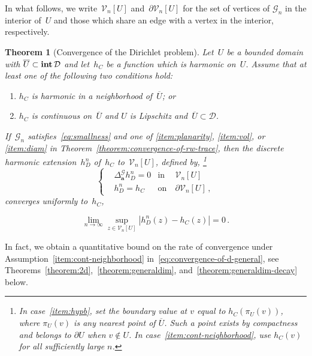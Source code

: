 \documentclass[12pt]{amsart}
\numberwithin{equation}{section}
\DeclareMathOperator{\intr}{\mathop{\bf int}}
\newtheorem{theoremA}{Theorem}[section]
\newcommand{\G}{\mathcal{G}}
\newcommand{\V}{\mathcal{V}}
\newcommand{\aDelta}{\hyperref[eq:geometric-laplacian]{{\Delta^{\mathcal{G}}_{\cond}}}}
\newcommand{\cond}{\hyperref[eq:geometric-laplacian]{\mathbf{a}}}
\begin{document}
In what follows, we write~$\V_n[U]$ and~$\partial \V_n[U]$ for the set of vertices of $\G_n$ in the interior of~$U$ and those which share an edge with a vertex in the interior, respectively. 
\begin{theoremA}[Convergence of the Dirichlet problem] \label{theorem:convergence-of-the-dirichlet-problem}
	Let~$U$ be a bounded domain with $\overline U\subset\intr\mathcal D$ and let~$h_C$ be a function which is harmonic on~$U$. Assume that at least one of the following 
	two conditions hold:  
	\begin{enumerate}[label = (\alph*)]
		\item $h_C$ is harmonic in a neighborhood of~$\overline{U}$; or \label{item:cont-neighborhood}
		\item $h_C$ is continuous on~$\overline{U}$ and $U$ is Lipschitz and~$\overline{U} \subset \mathcal{D}$. \label{item:hypb}
	\end{enumerate}
	 If~$\G_n$ satisfies~\eqref{eq:smallness} and one of \ref{item:planarity}, \ref{item:vol}, or \ref{item:diam} in Theorem~\ref{theorem:convergence-of-rw-trace}, 
	then the discrete harmonic extension~$h^{n}_D$ of~$h_C$ to~$\V_n[U]$, defined by, 
\footnote{In case~\ref{item:hypb}, set the boundary value at $v$ equal to $h_C(\pi_U(v))$, where $\pi_U(v)$ is any nearest point of $\overline U$. Such a point exists by compactness and belongs to $\partial U$ when $v\notin U$. In case~\ref{item:cont-neighborhood}, use $h_C(v)$ for all sufficiently large $n$.}
	\[	
	\left\{	
	\begin{aligned}
		&  \aDelta h^{n}_D = 0 & \mbox{in} & \ \V_n[U] \\
		& h^{n}_D = h_C  & \mbox{on} &  \ \partial \V_n[U]    \, ,
	\end{aligned}
	\right.
	\]
	converges uniformly to~$h_C$,

	\begin{equation}
		\label{eq:convergence-of-d-general}
	\lim_{n \to \infty} \sup_{z \in \V_n[U]} |h^{n}_D(z) - h_C(z)| = 0  \, .
	\end{equation}
\end{theoremA}	
\noindent In fact, we obtain a quantitative bound on the rate of convergence under Assumption~\ref{item:cont-neighborhood} in~\eqref{eq:convergence-of-d-general}, see Theorems~\ref{theorem:2d},~\ref{theorem:generaldim}, and~\ref{theorem:generaldim-decay} below. 
\end{document}
